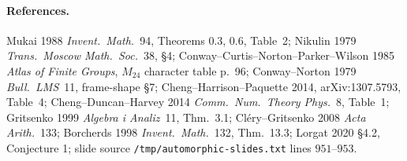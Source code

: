 \paragraph{References.}
Mukai 1988 \emph{Invent.\ Math.}~94, Theorems 0.3, 0.6, Table~2;
Nikulin 1979 \emph{Trans.\ Moscow Math.\ Soc.}~38, \S4;
Conway--Curtis--Norton--Parker--Wilson 1985 \emph{Atlas of Finite
Groups}, $M_{24}$ character table p.~96;
Conway--Norton 1979 \emph{Bull.\ LMS}~11, frame-shape \S7;
Cheng--Harrison--Paquette 2014, arXiv:1307.5793, Table~4;
Cheng--Duncan--Harvey 2014 \emph{Comm.\ Num.\ Theory Phys.}~8,
Table~1;
Gritsenko 1999 \emph{Algebra i Analiz}~11, Thm.~3.1;
Cl\'ery--Gritsenko 2008 \emph{Acta Arith.}~133;
Borcherds 1998 \emph{Invent.\ Math.}~132, Thm.~13.3;
Lorgat 2020 \S4.2, Conjecture 1;
slide source \texttt{/tmp/automorphic-slides.txt} lines $951$--$953$.
